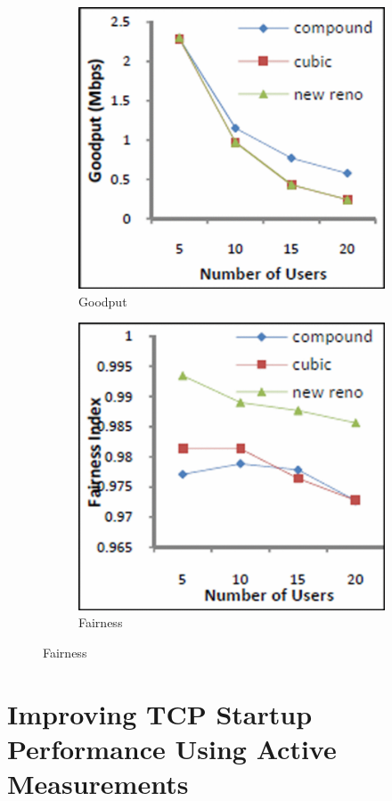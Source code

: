 \documentclass{beamer}
\begin{document}
\begin{frame}
\begin{figure}
\centering
\begin{subfigure}{.5\textwidth}
 	\centering
  	\includegraphics[width=.65\linewidth]{images/abdeljaouad10_goodput.png}
  	\caption{Goodput}
\end{subfigure}%
\begin{subfigure}{.5\textwidth}
 	\centering
  	\includegraphics[width=.65\linewidth]{images/abdeljaouad10_fairness_2.png}
  	\caption{Fairness}
\end{subfigure}
\end{figure}

\end{frame}


\section{Improving TCP Startup Performance Using Active Measurements}
\end{document}
